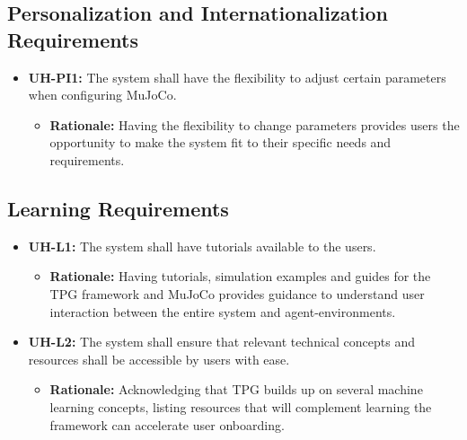 \documentclass[12pt]{article}
\begin{document}
\subsection{Personalization and Internationalization Requirements}
\begin{itemize}
  \item \textbf{UH-PI1:} The system shall have the flexibility to adjust certain parameters when configuring MuJoCo.
  \begin{itemize}
    \item \textbf{Rationale:} Having the flexibility to change parameters provides users the opportunity to make the system fit to their specific needs and requirements.
  \end{itemize}
\end{itemize}

\subsection{Learning Requirements}
\begin{itemize}
  \item \textbf{UH-L1:} The system shall have tutorials available to the users.
  \begin{itemize}
    \item \textbf{Rationale:} Having tutorials, simulation examples and guides for the TPG framework and MuJoCo provides guidance to understand user interaction between the entire system and agent-environments.
  \end{itemize}
  \item \textbf{UH-L2:} The system shall ensure that relevant technical concepts and resources shall be accessible by users with ease.
  \begin{itemize}
    \item \textbf{Rationale:} Acknowledging that TPG builds up on several machine learning concepts, listing resources that will complement learning the framework can accelerate user onboarding.
  \end{itemize}
\end{itemize}
\end{document}
